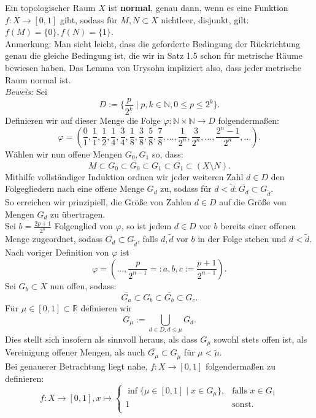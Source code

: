 \documentclass[11pt,leqno]{article}
\newcommand{\R}{\mathbb{R}}
\begin{document}
Ein topologischer Raum $X$ ist \textbf{normal}, genau dann, wenn es eine Funktion $f:X \rightarrow [0,1]$ gibt, sodass für $M,N \subset X$
nichtleer, disjunkt, gilt: $f(M)=\{0\}, f(N)=\{1\}$. \\
Anmerkung: Man sieht leicht, dass die geforderte Bedingung der Rückrichtung genau die gleiche Bedingung ist, die wir in Satz 1.5 schon für 
metrische Räume bewiesen haben. Das Lemma von Urysohn impliziert also, dass jeder metrische Raum normal ist.\\
\textit{Beweis:} Sei
\[D:= \{\frac{p}{2^k} \mid p,k \in \mathbb{N}, 0 \leq p \leq 2^k \}. \]
Definieren wir auf dieser Menge die Folge $\varphi: \mathbb{N} \times \mathbb{N} \rightarrow D$ folgendermaßen:
\[\varphi = (\frac{0}{1}, \frac{1}{1}, \frac{1}{2}, \frac{1}{4}, \frac{3}{4}, \frac{1}{8}, \frac{3}{8}, \frac{5}{8}, \frac{7}{8}, \dots, 
\frac{1}{2^n}, \frac{3}{2^n}, \dots, \frac{2^n-1}{2^n}, \dots).\]
Wählen wir nun offene Mengen $G_0, G_1$ so, dass: 
\[M \subset G_0 \subset \overline{G_0} \subset G_1 \subset \overline{G_1} \subset (X \setminus N). \]
Mithilfe vollständiger Induktion ordnen wir jeder weiteren Zahl $d \in D$ den Folgegliedern nach eine offene Menge $G_d$ zu, sodass für 
$d < \tilde{d}: \overline{G_d} \subset G_{\tilde{d}}.$ \\
So erreichen wir prinzipiell, die Größe von Zahlen $d \in D$ auf \glqq die Größe von Mengen $G_d$\grqq{} zu übertragen.\\
Sei $b = \frac{2p+1}{2^n}$ Folgenglied von $\varphi$, so ist jedem $d \in D$ vor $b$ bereits einer offenen Menge zugeordnet, sodass 
$\overline{G_d} \subset G_{\tilde{d}}$, falls $d, \tilde{d}$ vor $b$ in der Folge stehen und $d < \tilde{d}$. \\
Nach voriger Definition von $\varphi$ ist 
\[\varphi = ( ..., \frac{p}{2^{n-1}}=:a, b, c:=\frac{p+1}{2^{n-1}}). \]
Sei $G_b \subset X$ nun offen, sodass:
\[\overline{G_a} \subset G_b \subset \overline{G_b} \subset G_c.\]
Für $\mu \in [0,1]\subset \R$ definieren wir \[G_\mu := \bigcup_{d \in D, d \leq \mu}G_d .\] 
Dies stellt sich insofern als sinnvoll heraus, als dass $G_\mu$ sowohl stets offen ist, als Vereinigung offener Mengen, als auch $\overline{G_\mu}
\subset G_{\tilde{\mu}}$ für $\mu <\tilde{\mu}$.\\
Bei genauerer Betrachtung liegt nahe, $f:X \rightarrow [0,1]$ folgendermaßen zu definieren:
\[f:X \rightarrow [0,1], x \mapsto \begin{cases}
    \inf \{\mu \in [0,1] \mid x \in G_\mu\},  & \text{falls }x \in G_1\\
    1 & \text{sonst.} \\
\end{cases} \]
\end{document}
